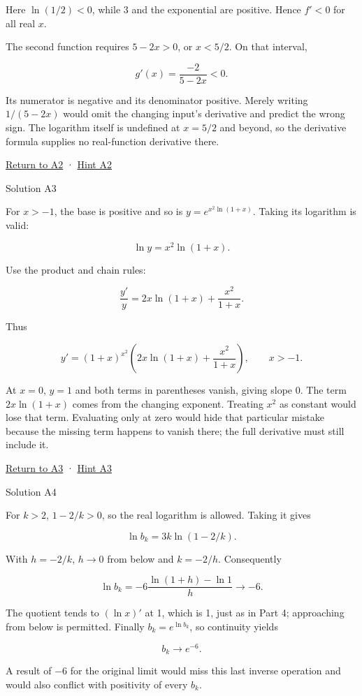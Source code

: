 \documentclass[
  11pt,
]{article}
\providecommand{\gt}{>}
\providecommand{\lt}{<}
\begin{document}
Here \(\ln(1/2)\lt 0\), while 3 and the exponential are positive. Hence
\(f'\lt 0\) for all real \(x\).

The second function requires \(5-2x\gt 0\), or \(x\lt 5/2\). On that
interval,

\[
g'(x)=\frac{-2}{5-2x}\lt 0.
\]

Its numerator is negative and its denominator positive. Merely writing
\(1/(5-2x)\) would omit the changing input's derivative and predict the
wrong sign. The logarithm itself is undefined at \(x=5/2\) and beyond,
so the derivative formula supplies no real-function derivative there.

\protect\hyperlink{task-a2}{Return to A2} ·
\protect\hyperlink{hint-a2}{Hint A2}

Solution A3

For \(x\gt -1\), the base is positive and so is \(y=e^{x^2\ln(1+x)}\).
Taking its logarithm is valid:

\[
\ln y=x^2\ln(1+x).
\]

Use the product and chain rules:

\[
\frac{y'}y=2x\ln(1+x)+\frac{x^2}{1+x}.
\]

Thus

\[
y'=(1+x)^{x^2}\left(2x\ln(1+x)+\frac{x^2}{1+x}\right),\qquad x\gt -1.
\]

At \(x=0\), \(y=1\) and both terms in parentheses vanish, giving slope
0. The term \(2x\ln(1+x)\) comes from the changing exponent. Treating
\(x^2\) as constant would lose that term. Evaluating only at zero would
hide that particular mistake because the missing term happens to vanish
there; the full derivative must still include it.

\protect\hyperlink{task-a3}{Return to A3} ·
\protect\hyperlink{hint-a3}{Hint A3}

Solution A4

For \(k\gt 2\), \(1-2/k\gt 0\), so the real logarithm is allowed. Taking
it gives

\[
\ln b_k=3k\ln(1-2/k).
\]

With \(h=-2/k\), \(h\to0\) from below and \(k=-2/h\). Consequently

\[
\ln b_k=-6\frac{\ln(1+h)-\ln1}{h}\longrightarrow-6.
\]

The quotient tends to \((\ln x)'\) at 1, which is 1, just as in Part 4;
approaching from below is permitted. Finally \(b_k=e^{\ln b_k}\), so
continuity yields

\[
b_k\longrightarrow e^{-6}.
\]

A result of \(-6\) for the original limit would miss this last inverse
operation and would also conflict with positivity of every \(b_k\).
\end{document}
